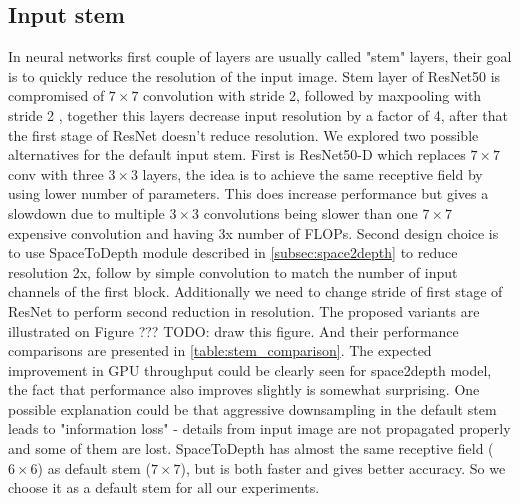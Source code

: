 

\subsection{Input stem} \label{subsec:stem_ablation}

In neural networks first couple of layers are usually called "stem" layers, their goal is to quickly reduce the resolution of the input image. Stem layer of ResNet50 is compromised of $7 \times 7$ convolution with stride 2, followed by maxpooling with stride 2 \cite{he2016deep_resnetv1}, together this layers decrease input resolution by a factor of 4, after that the first stage of ResNet doesn't reduce resolution. We explored two possible alternatives for the default input stem. First is ResNet50-D which replaces $7 \times 7$ conv with three $3 \times 3$ layers, the idea is to achieve the same receptive field by using lower number of parameters. This does increase performance but gives a slowdown due to multiple $3 \times 3$ convolutions being slower than one $7 \times 7$ expensive convolution and having 3x number of FLOPs. Second design choice is to use SpaceToDepth module described in \autoref{subsec:space2depth} to reduce resolution 2x, follow by simple convolution to match the number of input channels of the first block. Additionally we need to change stride of first stage of ResNet to perform second reduction in resolution. The proposed variants are illustrated on Figure ??? TODO: draw this figure.
And their performance comparisons are presented in \autoref{table:stem_comparison}. The expected improvement in GPU throughput could be clearly seen for space2depth model, the fact that performance also improves slightly is somewhat surprising. One possible explanation could be that aggressive downsampling in the default stem leads to "information loss" - details from input image are not propagated properly and some of them are lost. SpaceToDepth has almost the same receptive field ($6 \times 6$) as default stem ($ 7 \times 7$), but is both faster and gives better accuracy. So we choose it as a default stem for all our experiments.

